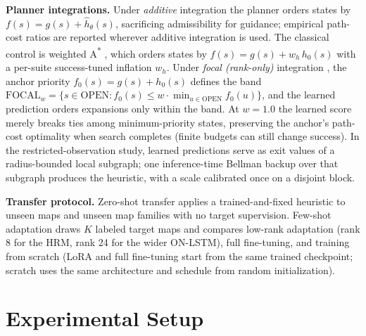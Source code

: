 \documentclass[letterpaper]{article} %
\begin{document}
\textbf{Planner integrations.} Under \emph{additive} integration the planner orders states by $f(s) = g(s) + \hat h_\theta(s)$, sacrificing admissibility for guidance; empirical path-cost ratios are reported wherever additive integration is used. The classical control is weighted A\textsuperscript{*} \citep{pohl1970}, which orders states by $f(s) = g(s) + w_h\, h_0(s)$ with a per-suite success-tuned inflation $w_h$. Under \emph{focal (rank-only)} integration \citep{pohl1970,pearl1982semiadmissible}, the anchor priority $f_0(s) = g(s) + h_0(s)$ defines the band $\mathrm{FOCAL}_w = \{ s \in \mathrm{OPEN} : f_0(s) \leq w \cdot \min_{u \in \mathrm{OPEN}} f_0(u) \}$, and the learned prediction orders expansions only within the band. At $w{=}1.0$ the learned score merely breaks ties among minimum-priority states, preserving the anchor's path-cost optimality when search completes (finite budgets can still change success). In the restricted-observation study, learned predictions serve as exit values of a radius-bounded local subgraph; one inference-time Bellman backup over that subgraph produces the heuristic, with a scale calibrated once on a disjoint block.

\textbf{Transfer protocol.} Zero-shot transfer applies a trained-and-fixed heuristic to unseen maps and unseen map families with no target supervision. Few-shot adaptation draws $K$ labeled target maps and compares low-rank adaptation \citep[LoRA;][]{hu2021lora} (rank 8 for the HRM, rank 24 for the wider ON-LSTM), full fine-tuning, and training from scratch (LoRA and full fine-tuning start from the same trained checkpoint; scratch uses the same architecture and schedule from random initialization).

\section{Experimental Setup}
\end{document}
